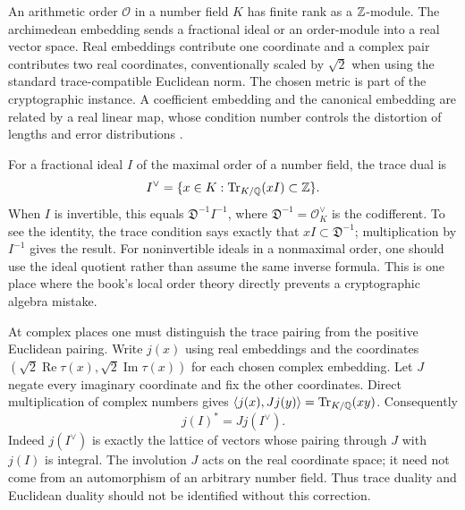 An arithmetic order $\mathcal O$ in a number field $K$ has finite rank as a $\mathbb{Z}$-module. The archimedean embedding sends a fractional ideal or an order-module into a real vector space. Real embeddings contribute one coordinate and a complex pair contributes two real coordinates, conventionally scaled by $\sqrt2$ when using the standard trace-compatible Euclidean norm. The chosen metric is part of the cryptographic instance. A coefficient embedding and the canonical embedding are related by a real linear map, whose condition number controls the distortion of lengths and error distributions \cite{LPRRingLWE}.

For a fractional ideal $I$ of the maximal order of a number field, the trace dual is
\[
 I^\vee=\{x\in K:\operatorname{Tr}_{K/\mathbb{Q}}(xI)\subset\mathbb{Z}\}.
\]
When $I$ is invertible, this equals $\mathfrak D^{-1}I^{-1}$, where
$\mathfrak D^{-1}=\mathcal O_K^\vee$ is the codifferent. To see the identity, the trace condition says exactly that $xI\subset\mathfrak D^{-1}$; multiplication by $I^{-1}$ gives the result. For noninvertible ideals in a nonmaximal order, one should use the ideal quotient rather than assume the same inverse formula. This is one place where the book's local order theory directly prevents a cryptographic algebra mistake.

At complex places one must distinguish the trace pairing from the positive
Euclidean pairing. Write $j(x)$ using real embeddings and the coordinates
$(\sqrt2\operatorname{Re}\tau(x),\sqrt2\operatorname{Im}\tau(x))$ for each
chosen complex embedding. Let $J$ negate every imaginary coordinate and fix
the other coordinates. Direct multiplication of complex numbers gives
$\langle j(x),Jj(y)\rangle=\operatorname{Tr}_{K/\mathbb{Q}}(xy)$. Consequently
\[
 j(I)^*=Jj(I^\vee).
\]
Indeed $j(I^\vee)$ is exactly the lattice of vectors whose pairing through
$J$ with $j(I)$ is integral. The involution $J$ acts on the real coordinate
space; it need not come from an automorphism of an arbitrary number field.
Thus trace duality and Euclidean duality should not be identified without
this correction.

